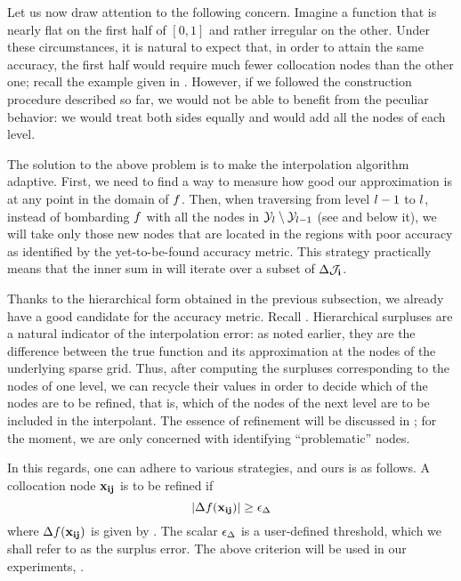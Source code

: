 Let us now draw attention to the following concern. Imagine a function that is
nearly flat on the first half of $[0, 1]$ and rather irregular on the other.
Under these circumstances, it is natural to expect that, in order to attain the
same accuracy, the first half would require much fewer collocation nodes than
the other one; recall the example given in . However, if we
followed the construction procedure described so far, we would not be able to
benefit from the peculiar behavior: we would treat both sides equally and would
add all the nodes of each level.

The solution to the above problem is to make the interpolation algorithm
adaptive. First, we need to find a way to measure how good our approximation is
at any point in the domain of $f$. Then, when traversing from level $l - 1$ to
$l$, instead of bombarding $f$ with all the nodes in $\mathcal{Y}_l \setminus \mathcal{Y}_{l -
1}$ (see  and below it), we will take only those
new nodes that are located in the regions with poor accuracy as identified by
the yet-to-be-found accuracy metric. This strategy practically means that the
inner sum in  will iterate over a subset of
$\Delta\mathcal{J}_{\mathbf{i}}$.

Thanks to the hierarchical form obtained in the previous subsection, we already
have a good candidate for the accuracy metric. Recall .
Hierarchical surpluses are a natural indicator of the interpolation error: as
noted earlier, they are the difference between the true function and its
approximation at the nodes of the underlying sparse grid. Thus, after computing
the surpluses corresponding to the nodes of one level, we can recycle their
values in order to decide which of the nodes are to be refined, that is, which
of the nodes of the next level are to be included in the interpolant. The
essence of refinement will be discussed in ; for the
moment, we are only concerned with identifying ``problematic'' nodes.

In this regards, one can adhere to various strategies, and ours is as follows. A
collocation node $\mathbf{x}_{\mathbf{i}\mathbf{j}}$ is to be refined if
\begin{equation} \elab{serror}
  \left| \surplus(\vx_{\vi\vj}) \right| \ge \serror
\end{equation}
where $\Delta f(\mathbf{x}_{\mathbf{i}\mathbf{j}})$ is given by . The scalar $\epsilon_\Delta$
is a user-defined threshold, which we shall refer to as the surplus error. The
above criterion will be used in our experiments, .

